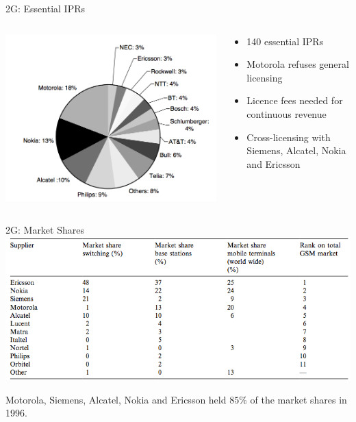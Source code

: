 \begin{frame}{2G: Essential IPRs}
  \begin{columns}
      \begin{column}{0.55\textwidth}
          \includegraphics[width=\textwidth]{pictures/iprs}
      \end{column}
      \hfill
    
      \begin{column}{0.45\textwidth}
          \begin{itemize}
              \item 140 essential IPRs
              \item Motorola refuses general licensing
              \item Licence fees needed for continuous revenue
              \item Cross-licensing with Siemens, Alcatel, Nokia and Ericsson
          \end{itemize}
      \end{column}
      \end{columns}
\end{frame}

\begin{frame}{2G: Market Shares}
  \includegraphics[width=\textwidth]{pictures/2gmarketshares}
  
  Motorola, Siemens, Alcatel, Nokia and Ericsson held $85\%$ of the market shares in 1996.
\end{frame}


